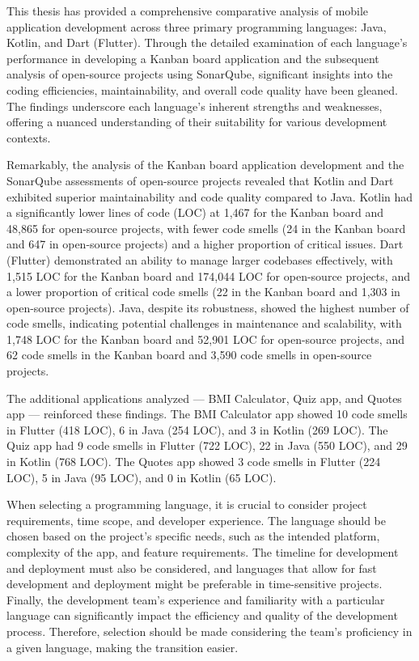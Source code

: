 This thesis has provided a comprehensive comparative analysis of mobile application development across three primary programming languages: Java, Kotlin, and Dart (Flutter). Through the detailed examination of each language's performance in developing a Kanban board application and the subsequent analysis of open-source projects using SonarQube, significant insights into the coding efficiencies, maintainability, and overall code quality have been gleaned. The findings underscore each language's inherent strengths and weaknesses, offering a nuanced understanding of their suitability for various development contexts.
\par
Remarkably, the analysis of the Kanban board application development and the SonarQube assessments of open-source projects revealed that Kotlin and Dart exhibited superior maintainability and code quality compared to Java. Kotlin had a significantly lower lines of code (LOC) at 1,467 for the Kanban board and 48,865 for open-source projects, with fewer code smells (24 in the Kanban board and 647 in open-source projects) and a higher proportion of critical issues. Dart (Flutter) demonstrated an ability to manage larger codebases effectively, with 1,515 LOC for the Kanban board and 174,044 LOC for open-source projects, and a lower proportion of critical code smells (22 in the Kanban board and 1,303 in open-source projects). Java, despite its robustness, showed the highest number of code smells, indicating potential challenges in maintenance and scalability, with 1,748 LOC for the Kanban board and 52,901 LOC for open-source projects, and 62 code smells in the Kanban board and 3,590 code smells in open-source projects.
\par
The additional applications analyzed — BMI Calculator, Quiz app, and Quotes app — reinforced these findings. The BMI Calculator app showed 10 code smells in Flutter (418 LOC), 6 in Java (254 LOC), and 3 in Kotlin (269 LOC). The Quiz app had 9 code smells in Flutter (722 LOC), 22 in Java (550 LOC), and 29 in Kotlin (768 LOC). The Quotes app showed 3 code smells in Flutter (224 LOC), 5 in Java (95 LOC), and 0 in Kotlin (65 LOC).
\par
When selecting a programming language, it is crucial to consider project requirements, time scope, and developer experience. The language should be chosen based on the project's specific needs, such as the intended platform, complexity of the app, and feature requirements. The timeline for development and deployment must also be considered, and languages that allow for fast development and deployment might be preferable in time-sensitive projects. Finally, the development team's experience and familiarity with a particular language can significantly impact the efficiency and quality of the development process. Therefore, selection should be made considering the team's proficiency in a given language, making the transition easier.
